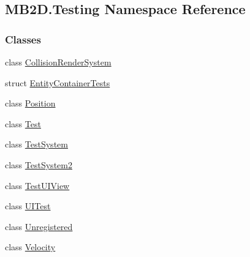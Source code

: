 \hypertarget{namespace_m_b2_d_1_1_testing}{}\subsection{M\+B2\+D.\+Testing Namespace Reference}
\label{namespace_m_b2_d_1_1_testing}
\subsubsection*{Classes}
\begin{DoxyCompactItemize}
\item 
class \hyperlink{class_m_b2_d_1_1_testing_1_1_collision_render_system}{Collision\+Render\+System}
\item 
struct \hyperlink{struct_m_b2_d_1_1_testing_1_1_entity_container_tests}{Entity\+Container\+Tests}
\item 
class \hyperlink{class_m_b2_d_1_1_testing_1_1_position}{Position}
\item 
class \hyperlink{class_m_b2_d_1_1_testing_1_1_test}{Test}
\item 
class \hyperlink{class_m_b2_d_1_1_testing_1_1_test_system}{Test\+System}
\item 
class \hyperlink{class_m_b2_d_1_1_testing_1_1_test_system2}{Test\+System2}
\item 
class \hyperlink{class_m_b2_d_1_1_testing_1_1_test_u_i_view}{Test\+U\+I\+View}
\item 
class \hyperlink{class_m_b2_d_1_1_testing_1_1_u_i_test}{U\+I\+Test}
\item 
class \hyperlink{class_m_b2_d_1_1_testing_1_1_unregistered}{Unregistered}
\item 
class \hyperlink{class_m_b2_d_1_1_testing_1_1_velocity}{Velocity}
\end{DoxyCompactItemize}
